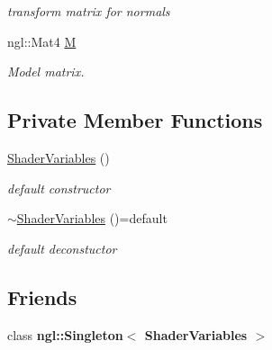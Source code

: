 \begin{DoxyCompactItemize}
\begin{DoxyCompactList}\small\item\em transform matrix for normals \end{DoxyCompactList}\item 
\hypertarget{struct_shader_variables_a949653174b6900cdb0b3c43e4acbda10}{ngl\-::\-Mat4 \hyperlink{struct_shader_variables_a949653174b6900cdb0b3c43e4acbda10}{M}}\label{struct_shader_variables_a949653174b6900cdb0b3c43e4acbda10}

\begin{DoxyCompactList}\small\item\em Model matrix. \end{DoxyCompactList}\end{DoxyCompactItemize}
\subsection*{Private Member Functions}
\begin{DoxyCompactItemize}
\item 
\hypertarget{struct_shader_variables_a4d52f8018bdf17f71192a566ceb66464}{\hyperlink{struct_shader_variables_a4d52f8018bdf17f71192a566ceb66464}{Shader\-Variables} ()}\label{struct_shader_variables_a4d52f8018bdf17f71192a566ceb66464}

\begin{DoxyCompactList}\small\item\em default constructor \end{DoxyCompactList}\item 
\hypertarget{struct_shader_variables_a04bcfc5787d0587994ebe68ee9232bff}{\hyperlink{struct_shader_variables_a04bcfc5787d0587994ebe68ee9232bff}{$\sim$\-Shader\-Variables} ()=default}\label{struct_shader_variables_a04bcfc5787d0587994ebe68ee9232bff}

\begin{DoxyCompactList}\small\item\em default deconstuctor \end{DoxyCompactList}\end{DoxyCompactItemize}
\subsection*{Friends}
\begin{DoxyCompactItemize}
\item 
\hypertarget{struct_shader_variables_a4b636626a2610eecffc6342c37450329}{class {\bfseries ngl\-::\-Singleton$<$ Shader\-Variables $>$}}\label{struct_shader_variables_a4b636626a2610eecffc6342c37450329}

\end{DoxyCompactItemize}


